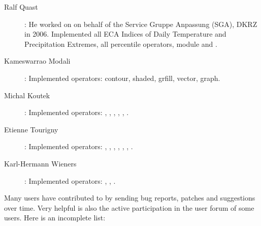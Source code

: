 \begin{description}
\item[Ralf Quast]: He worked on {\CDO} on behalf of the Service Gruppe Anpassung (SGA), DKRZ in 2006.
Implemented all ECA Indices of Daily Temperature and Precipitation Extremes, 
all percentile operators, module {} and {}.

\item[Kameswarrao Modali]: Implemented operators: contour, shaded, grfill, vector, graph.

\item[Michal Koutek]: Implemented operators: {}
{}, {}, {},
{}, {}, {}.

\item[Etienne Tourigny]: Implemented operators:  {}, {},
 {}, {}, {}, {}, {}.

\item[Karl-Hermann Wieners]: Implemented operators: {},  {},  {}.
\end{description}







\vspace{5mm}

Many users have contributed to {\CDO} by sending bug reports, patches
and suggestions over time.
Very helpful is also the active participation in the user forum of some users.
Here is an incomplete list:

